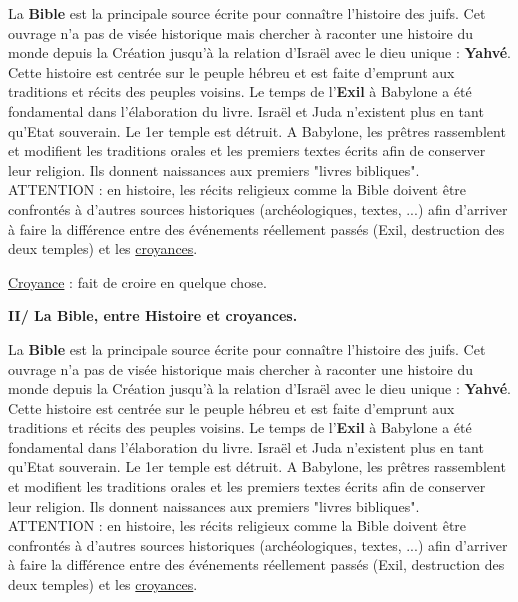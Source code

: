 \documentclass[12pt]{article}
\begin{document}
\setlength{\parindent}{1cm}La \textbf{Bible} est la principale source écrite pour connaître l'histoire des juifs. Cet ouvrage n'a pas de visée historique mais chercher à raconter une histoire du monde depuis la Création jusqu'à la relation d'Israël avec le dieu unique : \textbf{Yahvé}. Cette histoire est centrée sur le peuple hébreu et est faite d'emprunt aux traditions et récits des peuples voisins.
Le temps de l'\textbf{Exil} à Babylone a été fondamental dans l'élaboration du livre. Israël et Juda n'existent plus en tant qu'Etat souverain. Le 1er temple est détruit. A Babylone, les prêtres rassemblent et modifient les traditions orales et les premiers textes écrits afin de conserver leur religion. Ils donnent naissances aux premiers "livres bibliques".\\
ATTENTION : en histoire, les récits religieux comme la Bible doivent être confrontés à d'autres sources historiques (archéologiques, textes, ...) afin d'arriver à faire la différence entre des événements réellement passés (Exil, destruction des deux temples) et les \underline{croyances}.

\vspace{0.5cm}

\underline{Croyance} : fait de croire en quelque chose.

\vfill

\textbf{II/ La Bible, entre Histoire et croyances.}

\vspace{0.5cm}

\setlength{\parindent}{1cm}La \textbf{Bible} est la principale source écrite pour connaître l'histoire des juifs. Cet ouvrage n'a pas de visée historique mais chercher à raconter une histoire du monde depuis la Création jusqu'à la relation d'Israël avec le dieu unique : \textbf{Yahvé}. Cette histoire est centrée sur le peuple hébreu et est faite d'emprunt aux traditions et récits des peuples voisins.
Le temps de l'\textbf{Exil} à Babylone a été fondamental dans l'élaboration du livre. Israël et Juda n'existent plus en tant qu'Etat souverain. Le 1er temple est détruit. A Babylone, les prêtres rassemblent et modifient les traditions orales et les premiers textes écrits afin de conserver leur religion. Ils donnent naissances aux premiers "livres bibliques".\\
ATTENTION : en histoire, les récits religieux comme la Bible doivent être confrontés à d'autres sources historiques (archéologiques, textes, ...) afin d'arriver à faire la différence entre des événements réellement passés (Exil, destruction des deux temples) et les \underline{croyances}.
\end{document}

